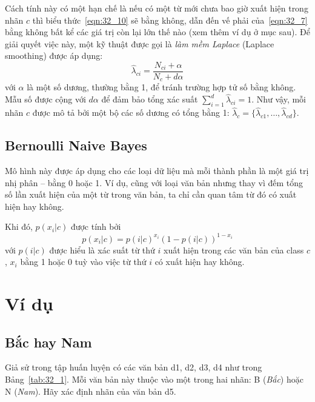 Cách tính này có một hạn chế là nếu có một từ mới chưa bao giờ xuất hiện trong
nhãn $c$ thì biểu thức~\eqref{eqn:32_10} sẽ bằng không, dẫn đến vế phải
của~\eqref{eqn:32_7} bằng không bất kể các giá trị còn lại lớn thế nào (xem
thêm ví dụ ở mục sau). Để giải quyết việc này, một kỹ thuật được gọi là 
\textit{làm mềm Laplace} (Laplace smoothing) được áp dụng:
\begin{equation} 
\label{eqn:32_11}
\hat{\lambda}_{ci} = \frac{N_{ci} + \alpha}{N_{c} + d\alpha}
\end{equation} 
với $\alpha$ là một số dương, thường bằng 1, để tránh trường hợp tử số bằng
không. Mẫu số được cộng với $d\alpha$ để đảm bảo tổng xác suất $\sum_{i=1}^d
\hat{\lambda}_{ci} = 1$.
 Như vậy, mỗi nhãn $c$ được mô tả bởi một bộ các số dương có tổng bằng 1: $\hat{\lambda}_c = \{\hat{\lambda}_{c1}, \dots, \hat{\lambda}_{cd}\}$.
 
 
\subsection{Bernoulli Naive Bayes }
 
Mô hình này được áp dụng cho các loại dữ liệu mà mỗi thành phần là một giá trị
nhị phân -- bằng 0 hoặc 1. Ví dụ, cũng với loại văn bản nhưng thay vì đếm tổng
số lần xuất hiện của một từ trong văn bản, ta chỉ cần quan tâm từ đó có xuất
hiện hay không.
 
Khi đó, $p(x_i | c) $ được tính bởi
\begin{equation} 
p(x_i | c) = p(i | c)^{x_i}(1 - p(i | c) )^{1 - x_i}
\end{equation} 
với $p(i | c)$ được hiểu là xác suất từ thứ $i$ xuất hiện trong các văn
bản của class $c$, $x_i$ bằng 1 hoặc 0 tuỳ vào việc từ thứ $i$ có xuất hiện hay không.
 
 
 
\section{Ví dụ }
 
 
\subsection{Bắc hay Nam }
Giả sử trong tập huấn luyện có các văn bản d1, d2, d3, d4 như trong Bảng~\ref{tab:32_1}. Mỗi văn bản này thuộc vào một trong hai nhãn: B (\textit{Bắc}) hoặc N (\textit{Nam}). Hãy xác định nhãn của văn bản d5. 

